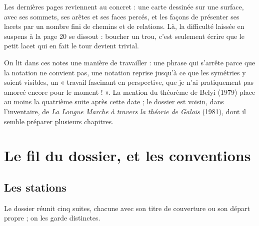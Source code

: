 \documentclass[11pt,a4paper]{article}
\begin{document}
\begin{resume}
Les dernières pages reviennent au concret : une carte dessinée sur une
surface, avec ses sommets, ses arêtes et ses faces percés, et les façons de
présenter ses lacets par un nombre fini de chemins et de relations. Là, la
difficulté laissée en suspens à la page 20 se dissout : boucher un trou, c'est
seulement écrire que le petit lacet qui en fait le tour devient trivial.

On lit dans ces notes une manière de travailler : une phrase qui s'arrête
parce que la notation ne convient pas, une notation reprise jusqu'à ce que les
symétries y soient visibles, un « travail fascinant en perspective, que je n'ai pratiquement pas amorcé encore pour le moment ! ». La mention du théorème de Belyi
(1979) place au moins la quatrième suite après cette date ; le dossier est
voisin, dans l'inventaire, de \emph{La Longue Marche à travers la théorie de
Galois} (1981), dont il semble préparer plusieurs chapitres.

\end{resume}

\section*{Le fil du dossier, et les conventions}

\subsection*{Les stations}

Le dossier réunit cinq suites, chacune avec son titre de couverture ou son
départ propre ; on les garde distinctes.
\end{document}

